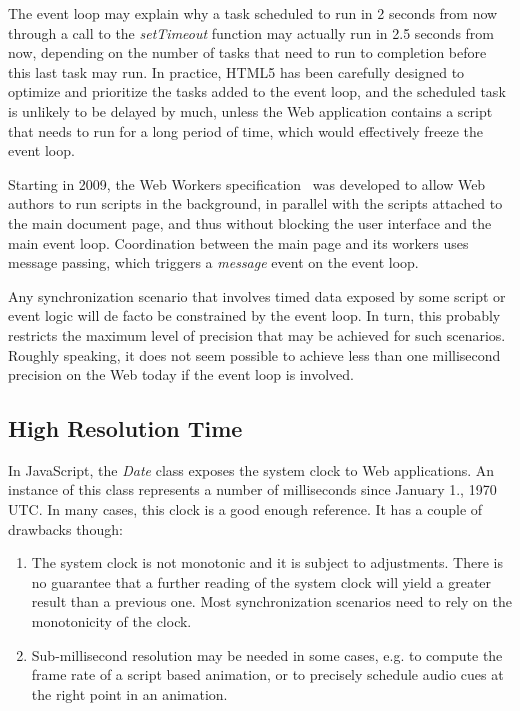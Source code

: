 \documentclass[graybox]{svmult}
\begin{document}
The event loop may explain why a task scheduled to run in 2 seconds from now
through a call to the \emph{setTimeout} function may actually run in 2.5 seconds
from now, depending on the number of tasks that need to run to completion
before this last task may run. In practice, HTML5 has been carefully designed
to optimize and prioritize the tasks added to the event loop, and the
scheduled task is unlikely to be delayed by much, unless the Web application
contains a script that needs to run for a long period of time, which would
effectively freeze the event loop.

Starting in 2009, the Web Workers specification~\cite{webworkers} was developed to allow
Web authors to run scripts in the background, in parallel with the scripts
attached to the main document page, and thus without blocking the user
interface and the main event loop. Coordination between the main page and its
workers uses message passing, which triggers a \emph{message} event on the event
loop.

Any synchronization scenario that involves timed data exposed by some script
or event logic will de facto be constrained by the event loop. In turn, this
probably restricts the maximum level of precision that may be achieved for
such scenarios. Roughly speaking, it does not seem possible to achieve less
than one millisecond precision on the Web today if the event loop is involved.


\subsection{High Resolution Time}
\label{sec:hrt}

In JavaScript, the \emph{Date} class exposes the system clock to Web
applications. An instance of this class represents a number of milliseconds
since January 1., 1970 UTC. In many cases, this clock is a good enough
reference. It has a couple of drawbacks though:

\begin{enumerate}

\item{

The system clock is not monotonic and it is subject to adjustments. There is
no guarantee that a further reading of the system clock will yield a greater
result than a previous one. Most synchronization scenarios need to rely on the
monotonicity of the clock. 

}
\item {

Sub-millisecond resolution may be needed in some
cases, e.g. to compute the frame rate of a script based animation, or to
precisely schedule audio cues at the right point in an animation.

}

\end{enumerate}
\end{document}
